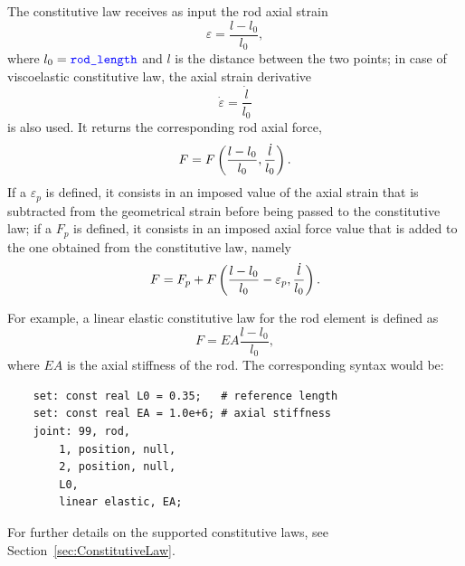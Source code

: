 The constitutive law  receives as input the rod axial strain
\begin{equation}
	\varepsilon = \frac{l - l_0}{l_0} ,
\end{equation}
where $l_0=\textcolor{blue}{\texttt{rod\_length}}$ and $l$ is the distance between the two points;
in case of viscoelastic constitutive law, the axial strain derivative
\begin{equation}
	\dot{\varepsilon} = \frac{\dot{l}}{l_0}
\end{equation}
is also used.
It returns the corresponding rod axial force,
\begin{displaymath}
	F = F\left( \frac{l - l_0}{l_0}, \frac{\dot{l}}{l_0} \right) .
\end{displaymath}
If a  $\varepsilon_p$ is defined,
it consists in an imposed value of the axial strain
that is subtracted from the geometrical strain
before being passed to the constitutive law;
if a  $F_p$ is defined,
it consists in an imposed axial force value
that is added to the one obtained from the constitutive law,
namely
\begin{displaymath}
	F = F_p + F\left( \frac{l - l_0}{l_0} - \varepsilon_p, \frac{\dot{l}}{l_0} \right) .
\end{displaymath}

For example, a linear elastic constitutive law for the rod element
is defined as
\begin{displaymath}
	F = EA \frac{l - l_0}{l_0} ,
\end{displaymath}
where $EA$ is the axial stiffness of the rod.
The corresponding syntax would be:
\begin{verbatim}
    set: const real L0 = 0.35;   # reference length
    set: const real EA = 1.0e+6; # axial stiffness
    joint: 99, rod,
        1, position, null,
        2, position, null,
        L0,
        linear elastic, EA;
\end{verbatim}

For further details on the supported constitutive laws, 
see Section~\ref{sec:ConstitutiveLaw}.



